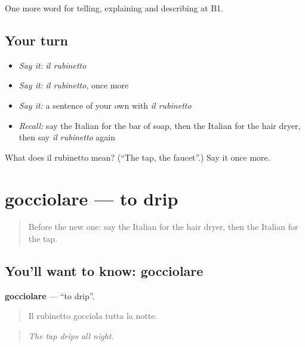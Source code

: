 \begin{grammarlens}[title={What you've built}]
One more word for telling, explaining and describing at B1.
\end{grammarlens}

\subsection*{Your turn}
\begin{itemize}
\raggedright
  \item \emph{Say it:} \emph{il rubinetto}
  \item \emph{Say it:} \emph{il rubinetto}, once more
  \item \emph{Say it:} a sentence of your own with \emph{il rubinetto}
  \item \emph{Recall:} say the Italian for the bar of soap, then the Italian for the hair dryer, then say \emph{il rubinetto} again
\end{itemize}

\begin{tcolorbox}[breakable,colback=teal!4,colframe=teal!35!black,title={Before you move on}]
What does il rubinetto mean? (\textquotedblleft{}The tap, the faucet\textquotedblright{}.) Say it once more.
\end{tcolorbox}
\section[gocciolare]{gocciolare — to drip}

\label{lesson:IT-C434-gocciolare}



\begin{quote}
Before the new one: say the Italian for the hair dryer, then the Italian for the tap.
\end{quote}

\subsection*{You'll want to know: gocciolare}
\textbf{gocciolare} — \textquotedblleft{}to drip\textquotedblright{}.

\begin{quote}
Il rubinetto gocciola tutta la notte.
\end{quote}

\begin{quote}
\emph{The tap drips all night.}
\end{quote}

